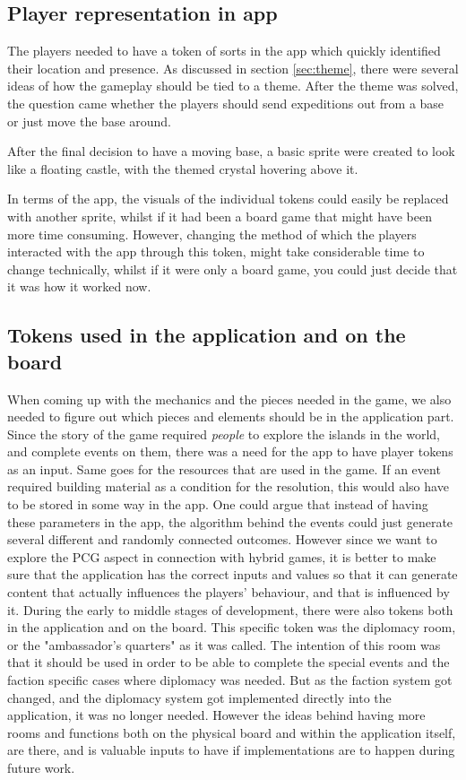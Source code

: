 \subsection{Player representation in app}
The players needed to have a token of sorts in the app which quickly identified their location and presence.
As discussed in section \ref{sec:theme}, there were several ideas of how the gameplay should be tied to a theme. After the theme was solved, the question came whether the players should send expeditions out from a base or just move the base around.

After the final decision to have a moving base, a basic sprite were created to look like a floating castle, with the themed crystal hovering above it.

In terms of the app, the visuals of the individual tokens could easily be replaced with another sprite, whilst if it had been a board game that might have been more time consuming.
However, changing the method of which the players interacted with the app through this token, might take considerable time to change technically, whilst if it were only a board game, you could just decide that it was how it worked now.

\subsection{Tokens used in the application and on the board}
When coming up with the mechanics and the pieces needed in the game, we also needed to figure out which pieces and elements should be in the application part. Since the story of the game required \textit{people} to explore the islands in the world, and complete events on them, there was a need for the app to have player tokens as an input. Same goes for the resources that are used in the game. If an event required building material as a condition for the resolution, this would also have to be stored in some way in the app. One could argue that instead of having these parameters in the app, the algorithm behind the events could just generate several different and randomly connected outcomes. However since we want to explore the PCG aspect in connection with hybrid games, it is better to make sure that the application has the correct inputs and values so that it can generate content that actually influences the players' behaviour, and that is influenced by it.
During the early to middle stages of development, there were also tokens both in the application and on the board. This specific token was the diplomacy  room, or the "ambassador's quarters" as it was called. The intention of this room was that it should be used in order to be able to complete the special events and the faction specific cases where diplomacy was needed. But as the faction system got changed, and the diplomacy system got implemented directly into the application, it was no longer needed. However the ideas behind having more rooms and functions both on the physical board and within the application itself, are there, and is valuable inputs to have if implementations are to happen during future work.

